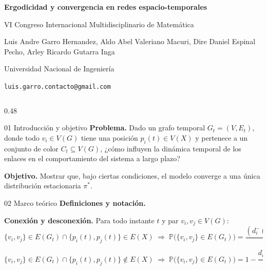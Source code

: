 \documentclass[final]{beamer}
\newcommand{\Prob}{\mathbb{P}}
\begin{document}
\begin{frame}[t]

\begin{center}
{\VeryHuge\bfseries Ergodicidad y convergencia en redes espacio-temporales\par}
\vspace{0.35cm}
{\Large VI Congreso Internacional Multidisciplinario de Matemática\par}
\vspace{0.35cm}
{\large Luis Andre Garro Hernandez, Aldo Abel Valeriano Macuri, Dire Daniel Espinal Pecho, Arley Ricardo Gutarra Inga\par}
{\large Universidad Nacional de Ingeniería\par}
{\large \texttt{luis.garro.contacto@gmail.com}\par}
\end{center}

\vspace{0.5cm}

\begin{columns}[t]

\begin{column}{0.48\paperwidth}

\begin{block}{01 Introducción y objetivo}
\textbf{Problema.} Dado un grafo temporal \(G_t=(V,E_t)\), donde todo \(v_i\in V(G)\) tiene una posición \(p_i(t)\in V(X)\) y pertenece a un conjunto de color \(C_t\subseteq V(G)\), ¿cómo influyen la dinámica temporal de los enlaces en el comportamiento del sistema a largo plazo?

\vspace{0.3cm}
\textbf{Objetivo.} Mostrar que, bajo ciertas condiciones, el modelo converge a una única distribución estacionaria \(\pi^*\).
\end{block}

\begin{block}{02 Marco teórico}
\textbf{Definiciones y notación.}

\vspace{0.2cm}
\textbf{Conexión y desconexión.} Para todo instante \(t\) y par \(v_i,v_j\in V(G)\):
\[
\{v_i,v_j\}\in E(G_t)\cap \{p_i(t),p_j(t)\}\in E(X)
\;\Longrightarrow\;
\Prob\bigl(\{v_i,v_j\}\in E(G_t)\bigr)
=
\frac{(d_i^-(v_j)+1)(d_i^-(v_j)+1)}{(n+1)^2}.
\]
\[
\{v_i,v_j\}\in E(G_t)\cap \{p_i(t),p_j(t)\}\notin E(X)
\;\Longrightarrow\;
\Prob\bigl(\{v_i,v_j\}\in E(G_t)\bigr)
=
1-\frac{d_i^-(v_j)d_i^-(v_j)}{n^2}.
\]


\end{block}
\end{column}
\end{columns}
\end{frame}
\end{document}
